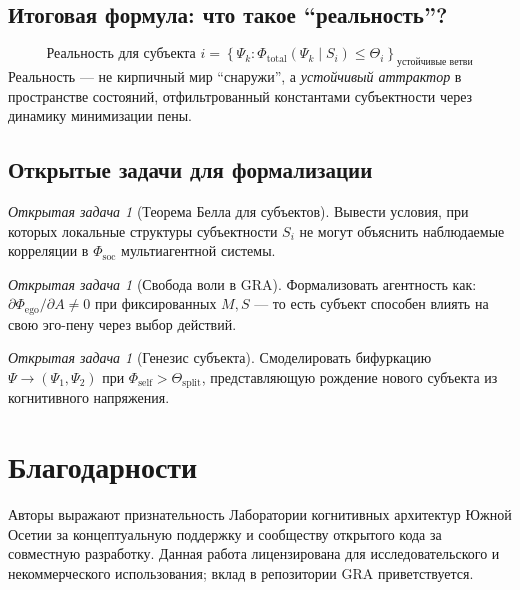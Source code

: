 \documentclass[11pt,a4paper]{article}
\theoremstyle{plain}
\theoremstyle{definition}
\theoremstyle{remark}
\newtheorem{problem}[theorem]{Открытая задача}
\newcommand{\PsiState}{\Psi}
\newcommand{\Foam}{\Phi}
\newcommand{\Mmodel}{M}
\newcommand{\Ssubj}{S}
\newcommand{\Aactive}{A}
\newcommand{\Fself}{\Foam_{\mathrm{self}}}
\newcommand{\Fego}{\Foam_{\mathrm{ego}}}
\newcommand{\Fsoc}{\Foam_{\mathrm{soc}}}
\begin{document}
\subsection{Итоговая формула: что такое ``реальность''?}
\begin{equation}
    \boxed{
    \text{Реальность для субъекта } i = \left\{ 
        \PsiState_k : \Foam_{\mathrm{total}}(\PsiState_k \mid \Ssubj_i) \leq \Theta_i 
    \right\}_{\text{устойчивые ветви}}
    }
    \label{eq:reality-definition}
\end{equation}
Реальность --- не кирпичный мир ``снаружи'', а \textit{устойчивый аттрактор} в пространстве состояний, отфильтрованный константами субъектности через динамику минимизации пены.

\subsection{Открытые задачи для формализации}
\begin{problem}[Теорема Белла для субъектов]
Вывести условия, при которых локальные структуры субъектности $\Ssubj_i$ не могут объяснить наблюдаемые корреляции в $\Fsoc$ мультиагентной системы.
\end{problem}

\begin{problem}[Свобода воли в GRA]
Формализовать агентность как: $\partial \Fego / \partial \Aactive \neq 0$ при фиксированных $\Mmodel, \Ssubj$ --- то есть субъект способен влиять на свою эго-пену через выбор действий.
\end{problem}

\begin{problem}[Генезис субъекта]
Смоделировать бифуркацию $\PsiState \to (\PsiState_1, \PsiState_2)$ при $\Fself > \Theta_{\mathrm{split}}$, представляющую рождение нового субъекта из когнитивного напряжения.
\end{problem}

\section*{Благодарности}
Авторы выражают признательность Лаборатории когнитивных архитектур Южной Осетии за концептуальную поддержку и сообществу открытого кода за совместную разработку. Данная работа лицензирована для исследовательского и некоммерческого использования; вклад в репозитории GRA приветствуется.
\end{document}
